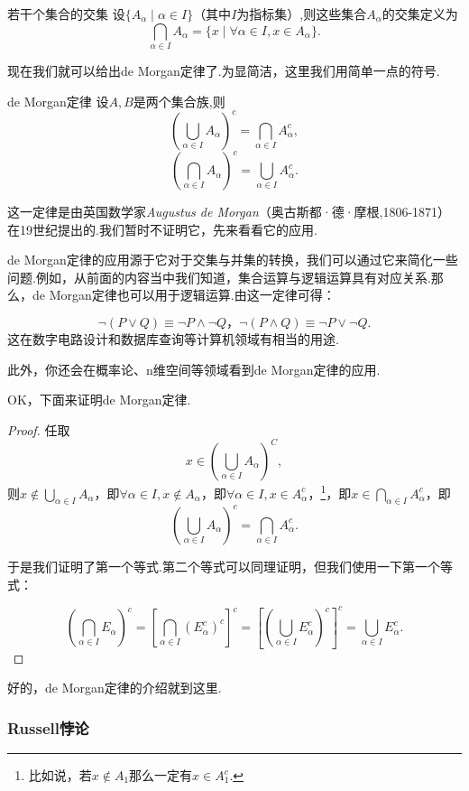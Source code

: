 \documentclass[lang=cn,math=cm,chinesefont=nofont,11pt,scheme=chinese,twocol]{elegantbook}
\begin{document}
\begin{definition}{若干个集合的交集}
  设$\{A_\alpha\mid\alpha\in I\}$（其中$I$为指标集）,则这些集合$A_\alpha$的交集定义为$$\bigcap_{\alpha\in I}A_\alpha=\{x\mid\forall\alpha\in I,x\in A_\alpha\}.$$
\end{definition}

现在我们就可以给出de Morgan定律了.为显简洁，这里我们用简单一点的符号.

\begin{theorem}{de Morgan定律}
  设$A,B$是两个集合族,则$$\left(\bigcup_{\alpha\in I}A_\alpha\right)^c=\bigcap_{\alpha\in I}A_\alpha^c,$$
  $$\left(\bigcap_{\alpha\in I}A_\alpha\right)^c=\bigcup_{\alpha\in I}A_\alpha^c.$$
\end{theorem}

这一定律是由英国数学家\textit{Augustus de Morgan}（奥古斯都·德·摩根,1806-1871）在19世纪提出的.我们暂时不证明它，先来看看它的应用.

de Morgan定律的应用源于它对于交集与并集的转换，我们可以通过它来简化一些问题.例如，从前面的内容当中我们知道，集合运算与逻辑运算具有对应关系.那么，de Morgan定律也可以用于逻辑运算.由这一定律可得：

$$\neg(P\lor Q)\equiv\neg P\land\neg Q\text{，}\neg(P\land Q)\equiv\neg P\lor\neg Q.$$
这在数字电路设计和数据库查询等计算机领域有相当的用途.

此外，你还会在概率论、n维空间等领域看到de Morgan定律的应用.

OK，下面来证明de Morgan定律.

\begin{proof}
  任取$$x\in\left(\bigcup_{\alpha\in I}A_{\alpha}\right)^{C},$$则$x\notin\bigcup_{\alpha\in I}A_{\alpha}$，即$\forall\alpha\in I,x\notin A_{\alpha}$，即$\forall\alpha\in I,x\in A_{\alpha}^{c}，$\footnote{比如说，若$x\notin A_1$那么一定有$x\in A_1^c$.}，即$x\in\bigcap_{\alpha\in I}A_{\alpha}^{c}$，即$$\left(\bigcup_{\alpha\in I}A_{\alpha}\right)^{c}=\bigcap_{\alpha\in I}A_{\alpha}^{c}.$$

  于是我们证明了第一个等式.第二个等式可以同理证明，但我们使用一下第一个等式：

  $$\left(\bigcap_{\alpha\in I}E_\alpha\right)^c=\left[\bigcap_{\alpha\in I}(E_\alpha^c)^c\right]^c=\left[\left(\bigcup_{\alpha\in I}E_\alpha^c\right)^c\right]^c=\bigcup_{\alpha\in I}E_\alpha^c.$$
\end{proof}

好的，de Morgan定律的介绍就到这里.

\subsubsection{Russell悖论}
\end{document}
